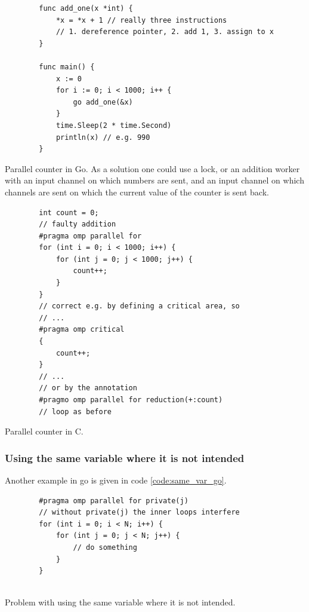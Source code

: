 \begin{codebox}[!htb]
    \begin{verbatim}
        func add_one(x *int) {
            *x = *x + 1 // really three instructions
            // 1. dereference pointer, 2. add 1, 3. assign to x
        }
        
        func main() {
            x := 0
            for i := 0; i < 1000; i++ {
                go add_one(&x)
            }
            time.Sleep(2 * time.Second)
            println(x) // e.g. 990
        }        
    \end{verbatim}
    \caption{Parallel counter in Go. As a solution one could use a lock, or an addition worker with
    an input channel on which numbers are sent, and an input channel on which channels are sent
    on which the current value of the counter is sent back.}
    \label{code:parallel_counter_go}
\end{codebox}

\begin{codebox}[!htb]
    \begin{verbatim}
        int count = 0;
        // faulty addition
        #pragma omp parallel for
        for (int i = 0; i < 1000; i++) {
            for (int j = 0; j < 1000; j++) {
                count++;
            }
        }
        // correct e.g. by defining a critical area, so
        // ...
        #pragma omp critical
        {
            count++;
        }
        // ...
        // or by the annotation
        #pragmo omp parallel for reduction(+:count)
        // loop as before
    \end{verbatim}
    \caption{Parallel counter in C.}
    \label{code:parallel_counter_c}
\end{codebox}

\subsubsection{Using the same variable where it is not intended}
Another example in go is given in code \ref{code:same_var_go}.

\begin{codebox}[!htb]
    \begin{verbatim}
        #pragma omp parallel for private(j)
        // without private(j) the inner loops interfere
        for (int i = 0; i < N; i++) {
            for (int j = 0; j < N; j++) {
                // do something
            }
        }
        
    \end{verbatim}
    \caption{Problem with using the same variable where it is not intended.}
    \label{code:double_loop}
\end{codebox}


